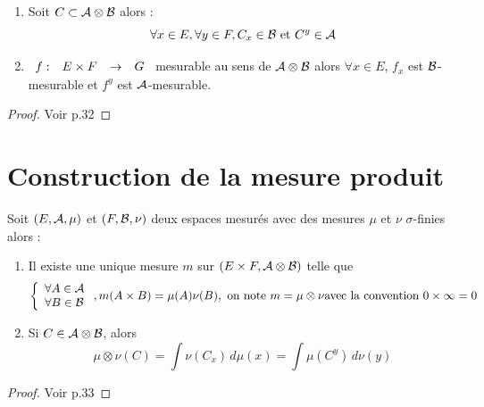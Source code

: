 \documentclass[]{report}
\begin{document}
\begin{prop}
    \begin{enumerate}
        \item Soit $C\subset \mathcal{A}\otimes \mathcal{B}$ alors :
        \[\forall x\in E, \forall y\in F,C_x\in\mathcal{B}\text{ et }C^y\in\mathcal{A}\]
        \item $\begin{array}{ccccc} f : & E\times F & \to & G \end{array}$ mesurable au sens de $\mathcal{A}\otimes \mathcal{B}$ alors $\forall x\in E$, $f_x$ est $\mathcal{B}$-mesurable et $f^y$ est $\mathcal{A}$-mesurable.
    \end{enumerate}
\end{prop}

\begin{proof}
    Voir p.32
\end{proof}

\section{Construction de la mesure produit}

\begin{tm}
    Soit $(E,\mathcal{A},\mu)$ et $(F,\mathcal{B},\nu)$ deux espaces mesurés avec des mesures $\mu$ et $\nu$ $\sigma$-finies alors :
    \begin{enumerate}
        \item Il existe une unique mesure $m$ sur $(E\times F,\mathcal{A}\otimes\mathcal{B})$ telle que
        \[\left\{\begin{array}{ll} \forall A\in\mathcal{A}\\ \forall B\in\mathcal{B} \end{array} \right., m(A\times B)=\mu(A)\nu(B),\text{ on note }m=\mu\otimes\nu\text{avec la convention $0\times\infty=0$}\]
        \item Si $C\in\mathcal{A}\otimes\mathcal{B}$, alors 
        \[\mu\otimes\nu (C)=\int\nu(C_x)\,d\mu(x)=\int\mu(C^y)\,d\nu(y)\]
    \end{enumerate}
\end{tm}

\begin{proof}
    Voir p.33
\end{proof}

\begin{re}
    
\end{re}
\end{document}
